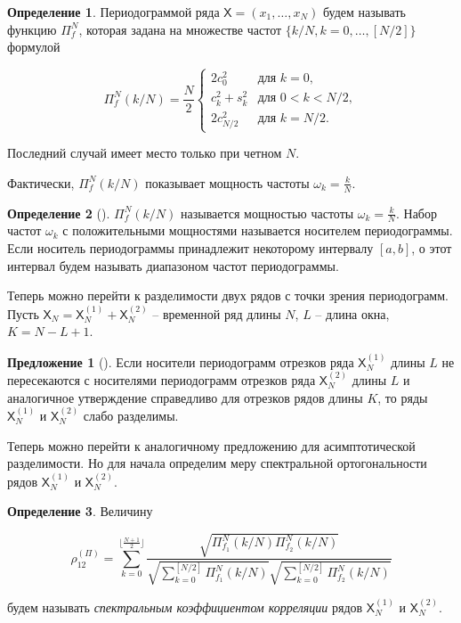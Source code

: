 \documentclass[12pt, specialist, subf
]{disser}
\theoremstyle{definition}
\newcommand{\TS}{\mathsf{X}}
\newtheorem{definition}{Определение} %
\newtheorem{proposition}{Предложение}
\begin{document}
\begin{definition}
	Периодограммой ряда $\TS = (x_1, \dots, x_N)$
	будем называть функцию \(\Pi_f^N\), которая задана на множестве частот
	\(\{k/N, k = 0, \ldots, [N/2]\}\) формулой

	\[
		\Pi_f^N(k/N) = \frac{N}{2}
		\begin{cases}
			2c_0^2        & \text{для } k = 0,       \\
			c_k^2 + s_k^2 & \text{для } 0 < k < N/2, \\
			2c_{N/2}^2    & \text{для } k = N/2.
		\end{cases}
	\]

	Последний случай имеет место только при четном \(N\).
\end{definition}

Фактически, $\Pi_f^N(k/N)$ показывает мощность частоты $\omega_k = \frac{k}{N}$.

\begin{definition}[\cite{golyandina2001analysis}]
	$\Pi_f^N(k/N)$ называется мощностью частоты $\omega_k = \frac{k}{N}$. Набор частот $\omega_k$ с положительными мощностями называется носителем периодограммы. Если носитель периодограммы принадлежит некоторому интервалу $\left[a, b\right]$, о этот интервал будем называть диапазоном частот периодограммы.
\end{definition}


Теперь можно перейти к разделимости двух рядов с точки зрения периодограмм.
Пусть $\TS_N = \TS_N^{(1)} + \TS_N^{(2)}$ -- временной ряд длины $N$, $L$ -- длина окна, $K = N-L + 1$.

\begin{proposition}[\cite{golyandina2001analysis}]
	\label{prop:tochn_razd}
	Если носители периодограмм отрезков ряда \( \TS_N^{(1)} \) длины \( L \) не пересекаются с носителями периодограмм отрезков ряда \( \TS_N^{(2)} \) длины \( L \) и аналогичное утверждение справедливо для отрезков рядов длины \( K \), то ряды \( \TS_N^{(1)} \) и \( \TS_N^{(2)} \) слабо разделимы.
\end{proposition}

Теперь можно перейти к аналогичному предложению для асимптотической разделимости. Но для начала определим меру спектральной ортогональности рядов $\TS_N^{(1)}$ и $\TS_N^{(2)}$.

\begin{definition}
	Величину

\[
\rho_{12}^{(\Pi)} {=} \sum_{k=0}^{\lfloor \frac{N+1}{2} \rfloor}\frac{\sqrt{\Pi_{f_1}^N (k/N) \Pi_{f_2}^N (k/N)}}{\sqrt{\sum_{k=0}^{[N/2]} \Pi_{f_1}^N (k/N)} \sqrt{\sum_{k=0}^{[N/2]} \Pi_{f_2}^N (k/N)}} \tag{13}
\]

будем называть \emph{спектральным коэффициентом корреляции} рядов \( \TS_N^{(1)} \) и \( \TS_N^{(2)} \).
\end{definition}
\end{document}
